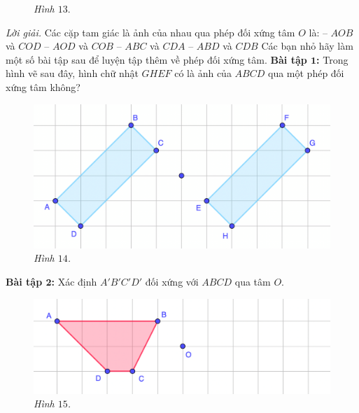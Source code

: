 \begin{multicols}{2}
\begin{figure}[H]
		\caption{\small\textit{\color{toancuabi}Hình $13.$}}
		\vspace*{-10pt}
	\end{figure}
	\textit{Lời giải.}
	Các cặp tam giác là ảnh của nhau qua phép đối xứng tâm $O$ là:
	\vskip 0.1cm
	-- $AOB$ và $COD$
	\vskip 0.1cm
	-- $AOD$ và $COB$
	\vskip 0.1cm
	-- $ABC$ và $CDA$
	\vskip 0.1cm
	-- $ABD$ và $CDB$
	\vskip 0.1cm
	Các bạn nhỏ hãy làm một số bài tập sau để luyện tập thêm về phép đối xứng tâm.
	\vskip 0.1cm
	\textbf{\color{toancuabi}Bài tập $\pmb1$:} Trong hình vẽ sau đây, hình chữ nhật $GHEF$ có là ảnh của $ABCD$ qua một phép đối xứng tâm không?
	\begin{figure}[H]
		\vspace*{5pt}
		\centering
		\captionsetup{labelformat= empty, justification=centering}
		\includegraphics[width= 1\linewidth]{13}
		\caption{\small\textit{\color{toancuabi}Hình $14$.}}
		\vspace*{-10pt}
	\end{figure}
	\textbf{\color{toancuabi}Bài tập $\pmb2$:} Xác định $A'B'C'D'$ đối xứng với $ABCD$ qua tâm $O$.
	\begin{figure}[H]
		\vspace*{-5pt}
		\centering
		\captionsetup{labelformat= empty, justification=centering}
		\includegraphics[width= 1\linewidth]{14}
		\caption{\small\textit{\color{toancuabi}Hình $15$.}}
		\vspace*{-10pt}
	\end{figure}

\end{multicols}
